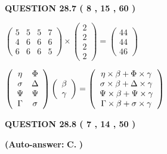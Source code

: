 \documentclass[12pt]{article}
\begin{document}
  
\noindent{}
 
 
  
  
{\textbf{\large{QUESTION
28.7 
 (           8 ,          15 ,          60 )
}}}

 
$\left( \begin{array}{ccccccccccccccc}
           5  & 
           5  & 
           5  & 
           7  \\ 
           4  & 
           6  & 
           6  & 
           6  \\ 
           6  & 
           6  & 
           6  & 
           5
\end{array}\right) \times
\left( \begin{array}{c}
           2  \\ 
           2  \\ 
           2  \\ 
           2
\end{array}\right)  =
\left( \begin{array}{c}
          44  \\ 
          44  \\ 
          46
\end{array}\right)  $
 
$  %
 \left( \begin{array}
 {
 c
 c
 }
 \eta & 
 \Phi \\ 
 \sigma & 
 \Delta \\ 
 \Psi & 
 \Psi \\ 
 \Gamma & 
 \sigma
 \end{array} \right)
 \left( \begin{array}
 {
 c
 }
 \beta \\ 
 \gamma
 \end{array} \right)
=
 \left( \begin{array}
 {
 c
 }
  \eta \times  \beta +  \Phi \times  \gamma \\ 
  \sigma \times  \beta +  \Delta \times  \gamma \\ 
  \Psi \times  \beta +  \Psi \times  \gamma \\ 
  \Gamma \times  \beta +  \sigma \times  \gamma
 \end{array} \right)
$
 
  
  
{\textbf{\large{QUESTION
28.8 
 (           7 ,          14 ,          50 )
}}}
 
 
{\textbf{(Auto-answer:}}
{\textbf{\large{
C.}}}
{\textbf{)}}
 
\end{document}
